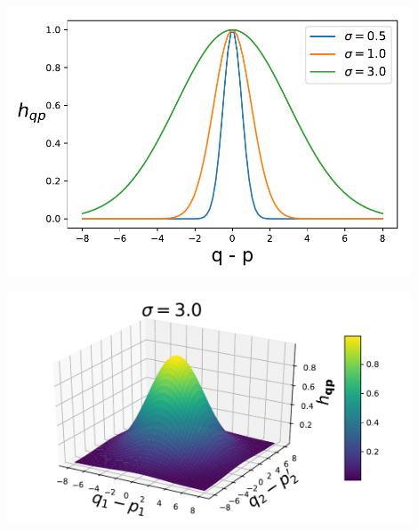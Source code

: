 \begin{frame}[t]
\begin{center}
\begin{minipage}{0.4\textwidth}
\begin{center}
	\includegraphics[width=0.9\textwidth]{img/guassian_function_1d}
\end{center}
\end{minipage}
\begin{minipage}{0.4\textwidth}
\begin{center}
	\includegraphics[width=0.9\textwidth]{img/guassian_function_2d_3Dview}
\end{center}
\end{minipage}
\end{center}

\end{frame}

